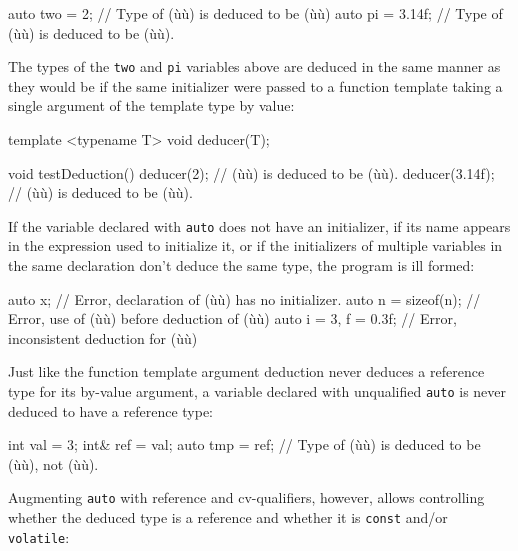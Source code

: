 \begin{emcppslisting}
auto two = 2;     // Type of (ù{}ù) is deduced to be (ù{}ù)
auto pi = 3.14f;  // Type of (ù{}ù) is deduced to be (ù{}ù).
\end{emcppslisting}
    
\noindent The types of the \lstinline!two! and \lstinline!pi! variables above are
deduced in the same manner as they would be if the same initializer were
passed to a function template taking a single argument of the template
type by value:

\begin{emcppslisting}
template <typename T> void deducer(T);

void testDeduction()
{
    deducer(2);      // (ù{}ù) is deduced to be (ù{}ù).
    deducer(3.14f);  // (ù{}ù) is deduced to be (ù{}ù).
}
\end{emcppslisting}
    
\noindent If the variable declared with \lstinline!auto! does not have an
initializer, if its name appears in the expression used to initialize
it, or if the initializers of multiple variables in the same declaration
don't deduce the same type, the program is ill formed:

\begin{emcppslisting}
auto x;                // Error, declaration of (ù{}ù) has no initializer.
auto n = sizeof(n);    // Error, use of (ù{}ù) before deduction of (ù{}ù)
auto i = 3, f = 0.3f;  // Error, inconsistent deduction for (ù{}ù)
\end{emcppslisting}
    
\noindent Just like the function template argument deduction never deduces a
reference type for its by-value argument, a variable declared with
unqualified \lstinline!auto! is never deduced to have a reference type:

\begin{emcppslisting}
int  val = 3;
int& ref = val;
auto tmp = ref;  // Type of (ù{}ù) is deduced to be (ù{}ù), not (ù{}ù).
\end{emcppslisting}
    
\noindent Augmenting \lstinline!auto! with reference and cv-qualifiers, however,
allows controlling whether the deduced type is a reference and whether
it is \lstinline!const! and/or \lstinline!volatile!:

